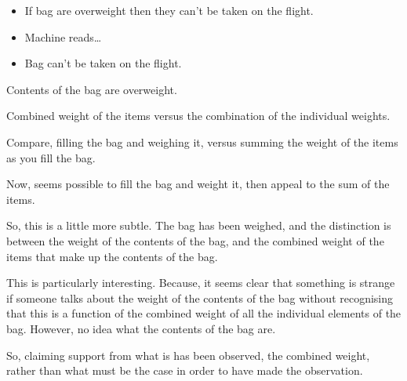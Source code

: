 \begin{note}

  \begin{illustration}
    \mbox{}
    \vspace{-\baselineskip}
    \begin{itemize}
    \item If bag are overweight then they can't be taken on the flight.
    \item Machine reads\dots
    \item Bag can't be taken on the flight.
    \end{itemize}
  \end{illustration}
  Contents of the bag are overweight.

  Combined weight of the items versus the combination of the individual weights.

  Compare, filling the bag and weighing it, versus summing the weight of the items as you fill the bag.

  Now, seems possible to fill the bag and weight it, then appeal to the sum of the items.

  So, this is a little more subtle.
  The bag has been weighed, and the distinction is between the weight of the contents of the bag, and the combined weight of the items that make up the contents of the bag.

  This is particularly interesting.
  Because, it seems clear that something is strange if someone talks about the weight of the contents of the bag without recognising that this is a function of the combined weight of all the individual elements of the bag.
  However, no idea what the contents of the bag are.

  So, claiming support from what is has been observed, the combined weight, rather than what must be the case in order to have made the observation.
\end{note}

